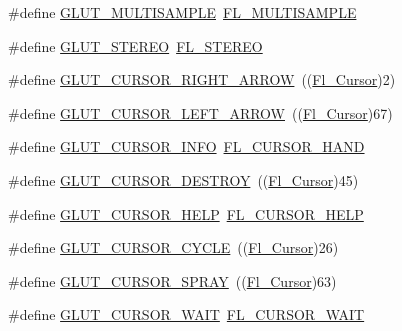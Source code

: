 \begin{DoxyCompactItemize}
\item 
\#define \hyperlink{glut_8_h_a3f15e21c2a814e8db3d00ec1e9f58d71}{G\+L\+U\+T\+\_\+\+M\+U\+L\+T\+I\+S\+A\+M\+P\+LE}~\hyperlink{_enumerations_8_h_aae982ff3b1a082b1a512b216b98061e0a03f76720b861e119423cc37b5506af82}{F\+L\+\_\+\+M\+U\+L\+T\+I\+S\+A\+M\+P\+LE}
\item 
\#define \hyperlink{glut_8_h_a0cd1ad5ec8468b9a0cdd4158e791dc19}{G\+L\+U\+T\+\_\+\+S\+T\+E\+R\+EO}~\hyperlink{_enumerations_8_h_aae982ff3b1a082b1a512b216b98061e0a1e01e6a4f9825b9b91703a4411e52827}{F\+L\+\_\+\+S\+T\+E\+R\+EO}
\item 
\#define \hyperlink{glut_8_h_a530956f6af4109bbf423edc44d99af6e}{G\+L\+U\+T\+\_\+\+C\+U\+R\+S\+O\+R\+\_\+\+R\+I\+G\+H\+T\+\_\+\+A\+R\+R\+OW}~((\hyperlink{_enumerations_8_h_a72bde974edc7926b1217dd51b8c7e8e0}{Fl\+\_\+\+Cursor})2)
\item 
\#define \hyperlink{glut_8_h_aa6a025062db4baaeef55877f5e76346d}{G\+L\+U\+T\+\_\+\+C\+U\+R\+S\+O\+R\+\_\+\+L\+E\+F\+T\+\_\+\+A\+R\+R\+OW}~((\hyperlink{_enumerations_8_h_a72bde974edc7926b1217dd51b8c7e8e0}{Fl\+\_\+\+Cursor})67)
\item 
\#define \hyperlink{glut_8_h_ade986ae64d50da64a4febd740259a286}{G\+L\+U\+T\+\_\+\+C\+U\+R\+S\+O\+R\+\_\+\+I\+N\+FO}~\hyperlink{_enumerations_8_h_a72bde974edc7926b1217dd51b8c7e8e0a1b25ce2668fb1ca7bd85b0ba4cc20ab7}{F\+L\+\_\+\+C\+U\+R\+S\+O\+R\+\_\+\+H\+A\+ND}
\item 
\#define \hyperlink{glut_8_h_a81a013ad9d0ca13d92e4736375ae7ad1}{G\+L\+U\+T\+\_\+\+C\+U\+R\+S\+O\+R\+\_\+\+D\+E\+S\+T\+R\+OY}~((\hyperlink{_enumerations_8_h_a72bde974edc7926b1217dd51b8c7e8e0}{Fl\+\_\+\+Cursor})45)
\item 
\#define \hyperlink{glut_8_h_abbb0d0f6aa73cfa15856ee183846f794}{G\+L\+U\+T\+\_\+\+C\+U\+R\+S\+O\+R\+\_\+\+H\+E\+LP}~\hyperlink{_enumerations_8_h_a72bde974edc7926b1217dd51b8c7e8e0a9fa6d5e3554972e4996535a5bff6260c}{F\+L\+\_\+\+C\+U\+R\+S\+O\+R\+\_\+\+H\+E\+LP}
\item 
\#define \hyperlink{glut_8_h_ac28acff8776266f8ae7e1d4f8d82d62f}{G\+L\+U\+T\+\_\+\+C\+U\+R\+S\+O\+R\+\_\+\+C\+Y\+C\+LE}~((\hyperlink{_enumerations_8_h_a72bde974edc7926b1217dd51b8c7e8e0}{Fl\+\_\+\+Cursor})26)
\item 
\#define \hyperlink{glut_8_h_a5cc671426e10120f1d8c4a6844269cb1}{G\+L\+U\+T\+\_\+\+C\+U\+R\+S\+O\+R\+\_\+\+S\+P\+R\+AY}~((\hyperlink{_enumerations_8_h_a72bde974edc7926b1217dd51b8c7e8e0}{Fl\+\_\+\+Cursor})63)
\item 
\#define \hyperlink{glut_8_h_a510bc737668232ba061f8740b6b48bc8}{G\+L\+U\+T\+\_\+\+C\+U\+R\+S\+O\+R\+\_\+\+W\+A\+IT}~\hyperlink{_enumerations_8_h_a72bde974edc7926b1217dd51b8c7e8e0a8275eef61a9b77c448f3c53502bee6e0}{F\+L\+\_\+\+C\+U\+R\+S\+O\+R\+\_\+\+W\+A\+IT}

\end{DoxyCompactItemize}
